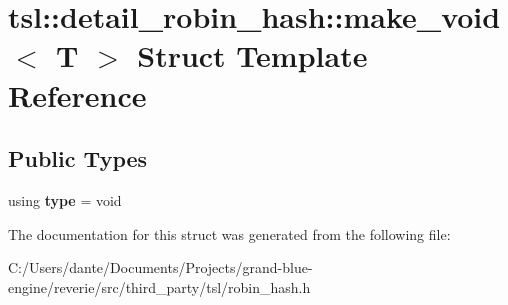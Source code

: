 \hypertarget{structtsl_1_1detail__robin__hash_1_1make__void}{}\section{tsl\+::detail\+\_\+robin\+\_\+hash\+::make\+\_\+void$<$ T $>$ Struct Template Reference}
\label{structtsl_1_1detail__robin__hash_1_1make__void}
\subsection*{Public Types}
\begin{DoxyCompactItemize}
\item 
\mbox{\label{structtsl_1_1detail__robin__hash_1_1make__void_a38320498b64553a4fea9eaf6db185d9f}} 
using {\bfseries type} = void
\end{DoxyCompactItemize}


The documentation for this struct was generated from the following file\+:\begin{DoxyCompactItemize}
\item 
C\+:/\+Users/dante/\+Documents/\+Projects/grand-\/blue-\/engine/reverie/src/third\+\_\+party/tsl/robin\+\_\+hash.\+h\end{DoxyCompactItemize}
